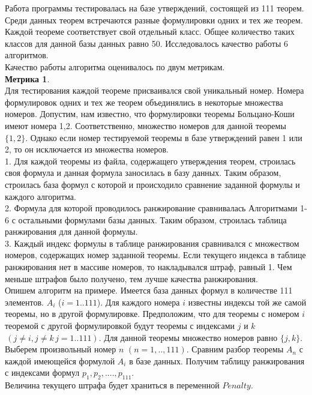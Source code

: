 \documentclass[12pt]{article}
\begin{document}
Работа программы тестировалась на базе утверждений, состоящей из 111 теорем. Среди данных теорем встречаются разные формулировки одних и тех же теорем. Каждой теореме соответствует свой отдельный класс. Общее количество таких классов для данной базы данных равно 50. Исследовалось качество работы 6 алгоритмов.\\

Качество работы алгоритма оценивалось по двум метрикам. \\

\textbf{Метрика 1}.\\

Для тестирования каждой теореме присваивался свой уникальный номер. Номера формулировок одних и тех же теорем объединялись в некоторые множества номеров. Допустим, нам известно, что формулировки теоремы Больцано-Коши имеют номера 1,2. Соответственно, множество номеров для данной теоремы $\{1,2\}$. Однако если номер тестируемой теоремы в базе утверждений равен 1 или 2, то он исключается из множества номеров.\\

1. Для каждой теоремы из файла, содержащего утверждения теорем, строилась своя формула и данная формула заносилась в базу данных. Таким образом, строилась база формул с которой и происходило сравнение заданной формулы и каждого алгоритма.\\

2. Формула для которой проводилось ранжирование сравнивалась Алгоритмами 1-6  с остальными формулами базы данных. Таким образом, строилась таблица ранжирования для данной формулы.\\

3. Каждый индекс формулы в таблице ранжирования сравнивался с множеством номеров, содержащих номер заданной теоремы. Если текущего индекса в таблице ранжирования нет в массиве номеров, то накладывался штраф, равный 1. Чем меньше штрафов было получено, тем лучше качества ранжирования.\\

Опишем алгоритм на примере. Имеется база данных формул в количестве 111 элементов. $A_i$ ($i=1..111$). Для каждого номера $i$  известны индексы той же самой теоремы, но в другой формулировке. Предположим, что для теоремы с номером $i$ теоремой с другой формулировкой будут теоремы  с индексами $j$ и $k$ $\,(j \neq i, j \neq k \, j=1..111)$. Для данной теоремы множество номеров равно $\{j,k\}$. \\

Выберем произвольный номер $n \,\, (n=1,..,111)$. Сравним разбор теоремы $A_n$ с каждой имеющейся  формулой $A_i$ в базе данных. Получим таблицу ранжирования с индексами формул $p_1,p_2,....,p_{111}$. \\
Величина текущего штрафа будет храниться в переменной $Penalty$. \\
\end{document}
